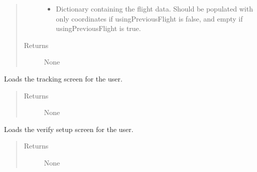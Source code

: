\documentclass[letterpaper,10pt,english]{sphinxmanual}
\begin{document}
\begin{fulllineitems}
\begin{fulllineitems}
\begin{quote}
\begin{description}
\begin{itemize}
\item {} 
 \textendash{} Dictionary containing the flight data. Should be populated with only coordinates if usingPreviousFlight is false, and empty if usingPreviousFlight is true.

\end{itemize}

\item[{Returns}] \leavevmode
None

\end{description}\end{quote}

\end{fulllineitems}


\begin{fulllineitems}
\label{\detokenize{index:src.Controllers.Program_Controller.Controller.show_tracking_window}}
Loads the tracking screen for the user.
\begin{quote}\begin{description}
\item[{Returns}] \leavevmode
None

\end{description}\end{quote}

\end{fulllineitems}


\begin{fulllineitems}
\label{\detokenize{index:src.Controllers.Program_Controller.Controller.show_verify_screen}}
Loads the verify setup screen for the user.
\begin{quote}\begin{description}
\item[{Returns}] \leavevmode
None

\end{description}\end{quote}


\end{fulllineitems}
\end{fulllineitems}
\end{document}
